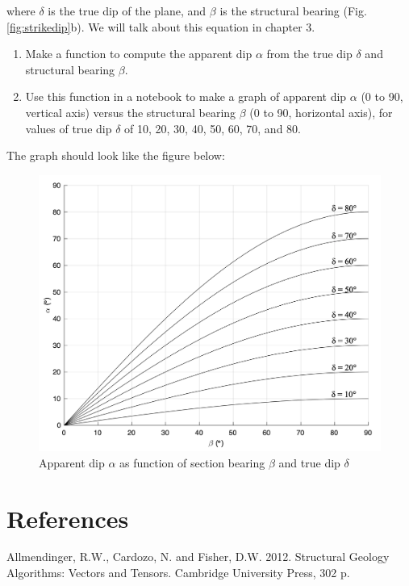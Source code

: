 \documentclass[a4paper , 12pt]{book}
\begin{document}
\begin{enumerate}
    where $\delta$ is the true dip of the plane, and $\beta$ is the structural bearing (Fig. \ref{fig:strikedip}b). We will talk about this equation in chapter 3. 
    
    \begin {enumerate}
    \item Make a function to compute the apparent dip $\alpha$ from the true dip $\delta$ and structural bearing $\beta$. 
    \item Use this function in a notebook to make a graph of apparent dip $\alpha$ (0 to 90\degree, vertical axis) versus the structural bearing $\beta$ (0 to 90\degree, horizontal axis), for values of true dip $\delta$ of 10, 20, 30, 40, 50, 60, 70, and 80\degree. 
    \end{enumerate}
    
    The graph should look like the figure below:
    
    \begin{figure}[H]
        \centering
        \includegraphics[width=12cm]{Figures/ch1f3.png}
        \caption{Apparent dip $\alpha$ as function of section bearing $\beta$ and true dip $\delta$}
        \label{fig:apparentdip}
    \end{figure}
\end{enumerate}

\section*{References}

Allmendinger, R.W., Cardozo, N. and Fisher, D.W. 2012. Structural Geology Algorithms: Vectors and Tensors. Cambridge University Press, 302 p.
\end{document}
